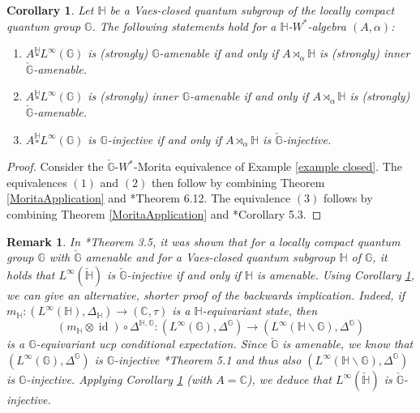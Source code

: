 \documentclass[reqno]{amsart}
\numberwithin{equation}{section}
\newtheorem{Cor}[Theorem]{Corollary}
\newtheorem{Rem}[Theorem]{Remark}
\DeclareMathOperator{\id}{\mathrm{id}}
\newcommand{\C}{\mathbb{C}}
\newcommand{\G}{\mathbb{G}}
\begin{document}
\begin{Cor}\label{app1} Let $\mathbb{H}$ be a Vaes-closed quantum subgroup of the locally compact quantum group $\G$. The following statements hold for a $\mathbb{H}$-$W^*$-algebra $(A, \alpha)$:
\begin{enumerate}\setlength\itemsep{-0.5em}
    \item $A \overset{\mathbb{H}}{\square} L^\infty(\G)$ is (strongly) $\G$-amenable if and only if $A\rtimes_\alpha \mathbb{H}$ is (strongly) inner $\check{\G}$-amenable.
    \item $A \overset{\mathbb{H}}{\square} L^\infty(\G)$ is (strongly) inner $\G$-amenable if and only if $A\rtimes_\alpha \mathbb{H}$ is (strongly) $\check{\G}$-amenable.
    \item $A \overset{\mathbb{H}}{\square} L^\infty(\G)$ is $\G$-injective if and only if $A\rtimes_\alpha \mathbb{H}$ is $\check{\G}$-injective.
\end{enumerate}
\end{Cor}
\begin{proof}
    Consider the $\check{\G}$-$W^*$-Morita equivalence of Example \ref{example closed}. The equivalences $(1)$ and $(2)$ then follow by combining Theorem \ref{MoritaApplication} and \cite{DCDR24a}*{Theorem 6.12}. The equivalence $(3)$ follows by combining Theorem \ref{MoritaApplication} and \cite{DR24a}*{Corollary 5.3}.
\end{proof}

\begin{Rem}
    In \cite{Cr17b}*{Theorem 3.5}, it was shown that for a locally compact quantum group $\G$ with $\check{\G}$ amenable and for a Vaes-closed quantum subgroup $\mathbb{H}$ of $\G$, it holds that $L^\infty(\check{\mathbb{H}})$ is $\check{\G}$-injective if and only if $\mathbb{H}$ is amenable. Using Corollary \ref{app1}, we can give an alternative, shorter proof of the backwards implication. Indeed, if $m_\mathbb{H}: (L^\infty(\mathbb{H}), \Delta_\mathbb{H})\to (\C, \tau)$ is a $\mathbb{H}$-equivariant state, then
    $$(m_\mathbb{H}\otimes \id) \circ \Delta^{\mathbb{H}, \G}: (L^\infty(\G), \Delta^\G)\to (L^\infty(\mathbb{H}\backslash \G), \Delta^\G)$$
    is a $\G$-equivariant ucp conditional expectation. Since $\check{\G}$ is amenable, we know that $(L^\infty(\G), \Delta^\G)$ is $\G$-injective \cite{Cr17a}*{Theorem 5.1} and thus also $(L^\infty(\mathbb{H}\backslash \G), \Delta^\G)$ is $\G$-injective. Applying Corollary \ref{app1} (with $A= \mathbb{C}$), we deduce that $L^\infty(\check{\mathbb{H}})$ is $\check{\G}$-injective.
\end{Rem}
\end{document}
